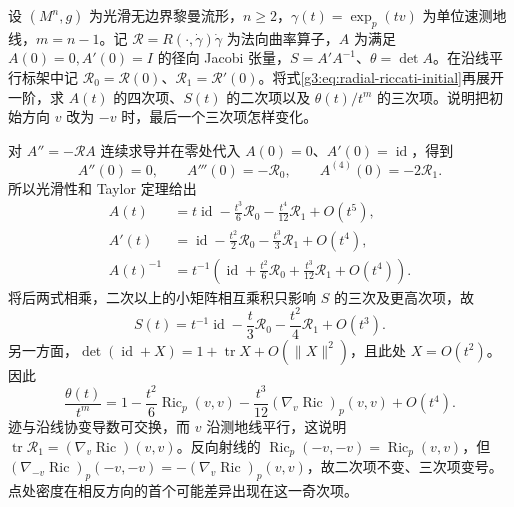 \begin{exercise}\label{g3:ex:riccati-higher-radial-expansion}
	设 \((M^n,g)\) 为光滑无边界黎曼流形，\(n\ge2\)，\(\gamma(t)=\exp_p(tv)\) 为单位速测地线，\(m=n-1\)。记 \(\mathcal R=R(\cdot,\dot\gamma)\dot\gamma\) 为法向曲率算子，\(A\) 为满足 \(A(0)=0,A'(0)=I\) 的径向 Jacobi 张量，\(S=A'A^{-1}\)、\(\theta=\det A\)。在沿线平行标架中记 \(\mathcal R_0=\mathcal R(0)\)、\(\mathcal R_1=\mathcal R'(0)\)。将式\eqref{g3:eq:radial-riccati-initial}再展开一阶，求 \(A(t)\) 的四次项、\(S(t)\) 的二次项以及 \(\theta(t)/t^m\) 的三次项。说明把初始方向 \(v\) 改为 \(-v\) 时，最后一个三次项怎样变化。
\end{exercise}
\begin{solution}
	对 \(A''=-\mathcal R A\) 连续求导并在零处代入 \(A(0)=0\)、\(A'(0)=\operatorname{id}\)，得到
	\[
		A''(0)=0,\qquad A'''(0)=-\mathcal R_0,\qquad A^{(4)}(0)=-2\mathcal R_1.
	\]
	所以光滑性和 Taylor 定理给出
	\[
		\begin{aligned}
		A(t)&=t\operatorname{id}-\frac{t^3}{6}\mathcal R_0-\frac{t^4}{12}\mathcal R_1+O(t^5),\\
		A'(t)&=\operatorname{id}-\frac{t^2}{2}\mathcal R_0-\frac{t^3}{3}\mathcal R_1+O(t^4),\\
		A(t)^{-1}&=t^{-1}\left(\operatorname{id}+\frac{t^2}{6}\mathcal R_0+\frac{t^3}{12}\mathcal R_1+O(t^4)\right).
		\end{aligned}
	\]
	将后两式相乘，二次以上的小矩阵相互乘积只影响 \(S\) 的三次及更高次项，故
	\[
		S(t)=t^{-1}\operatorname{id}-\frac t3\mathcal R_0-\frac{t^2}{4}\mathcal R_1+O(t^3).
	\]
	另一方面，\(\det(\operatorname{id}+X)=1+\operatorname{tr}X+O(\lVert X\rVert^2)\)，且此处 \(X=O(t^2)\)。因此
	\[
		\frac{\theta(t)}{t^m}
		=1-\frac{t^2}{6}\operatorname{Ric}_p(v,v)
		-\frac{t^3}{12}(\nabla_v\operatorname{Ric})_p(v,v)+O(t^4).
	\]
	迹与沿线协变导数可交换，而 \(v\) 沿测地线平行，这说明 \(\operatorname{tr}\mathcal R_1=(\nabla_v\operatorname{Ric})(v,v)\)。反向射线的 \(\operatorname{Ric}_p(-v,-v)=\operatorname{Ric}_p(v,v)\)，但
	\((\nabla_{-v}\operatorname{Ric})_p(-v,-v)=-(\nabla_v\operatorname{Ric})_p(v,v)\)，故二次项不变、三次项变号。点处密度在相反方向的首个可能差异出现在这一奇次项。
\end{solution}

